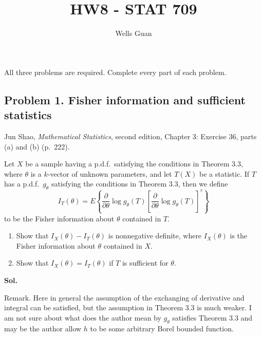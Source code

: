 \documentclass[lang=en,11pt,a4paper,citestyle=authoryear,nobib=true]{elegantpaper}
\title{HW8 - STAT 709}
\author{Wells Guan}
\begin{document}
\maketitle

\noindent All three problems are required. Complete every part of each problem.

\subsection*{Problem 1. Fisher information and sufficient statistics}
Jun Shao, \textit{Mathematical Statistics}, second edition, Chapter 3:
Exercise 36, parts (a) and (b) (p.~222).

Let $X$ be a sample having a p.d.f.\ satisfying the conditions in
Theorem 3.3, where $\theta$ is a $k$-vector of unknown parameters, and let
$T(X)$ be a statistic. If $T$ has a p.d.f.\ $g_\theta$ satisfying the
conditions in Theorem 3.3, then we define
\[
I_T(\theta)=E\left\{
\frac{\partial}{\partial\theta}\log g_\theta(T)
\left[\frac{\partial}{\partial\theta}\log g_\theta(T)\right]^\tau
\right\}
\]
to be the Fisher information about $\theta$ contained in $T$.
\begin{enumerate}[label=(\alph*),leftmargin=*]
\item Show that $I_X(\theta)-I_T(\theta)$ is nonnegative definite,
where $I_X(\theta)$ is the Fisher information about $\theta$ contained in $X$.
\item Show that $I_X(\theta)=I_T(\theta)$ if $T$ is sufficient for $\theta$.
\end{enumerate}

\par\vspace{0.5em}\noindent\textbf{Sol.}\par
Remark. Here in general the assumption of the exchanging of derivative and integral can be satisfied, but the assumption in Theorem 3.3 is much weaker. I am not sure about what does the author mean by $g_{\theta}$ satisfies Theorem 3.3 and may be the author allow $h$ to be some arbitrary Borel bounded function.\par
\end{document}
